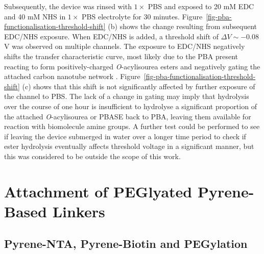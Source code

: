 \documentclass[
  a4paper,
]{scrbook}
\begin{document}
Subsequently, the device was rinsed with \(1 \times\) PBS and exposed to
20 mM EDC and 40 mM NHS in \(1 \times\) PBS electrolyte for 30 minutes.
Figure~\ref{fig-pba-functionalisation-threshold-shift} (b) shows the
change resulting from subsequent EDC/NHS exposure. When EDC/NHS is
added, a threshold shift of \(\Delta V \sim -0.08\) V was observed on
multiple channels. The exposure to EDC/NHS negatively shifts the
transfer characteristic curve, most likely due to the PBA present
reacting to form positively-charged \emph{O}-acylisourea esters and
negatively gating the attached carbon nanotube network
\autocite{Heller2008,Hermanson2013-4}.
Figure~\ref{fig-pba-functionalisation-threshold-shift} (c) shows that
this shift is not significantly affected by further exposure of the
channel to PBS. The lack of a change in gating may imply that hydrolysis
over the course of one hour is insufficient to hydrolyse a significant
proportion of the attached \emph{O}-acylisourea or PBASE back to PBA,
leaving them available for reaction with biomolecule amine groups. A
further test could be performed to see if leaving the device submerged
in water over a longer time period to check if ester hydrolysis
eventually affects threshold voltage in a significant manner, but this
was considered to be outside the scope of this work.

\hypertarget{sec-NTA-biotin-PEG}{%
\section{Attachment of PEGlyated Pyrene-Based
Linkers}\label{sec-NTA-biotin-PEG}}

\hypertarget{pyrene-nta-pyrene-biotin-and-pegylation}{%
\subsection{Pyrene-NTA, Pyrene-Biotin and
PEGylation}\label{pyrene-nta-pyrene-biotin-and-pegylation}}
\end{document}
